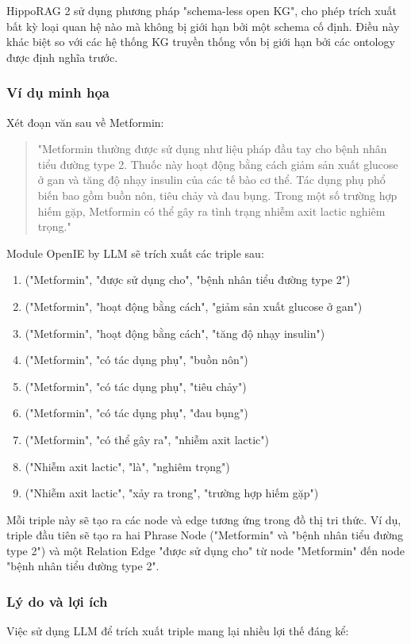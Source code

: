 HippoRAG 2 sử dụng phương pháp "schema-less open KG", cho phép trích xuất bất kỳ loại quan hệ nào mà không bị giới hạn bởi một schema cố định. Điều này khác biệt so với các hệ thống KG truyền thống vốn bị giới hạn bởi các ontology được định nghĩa trước.

\subsubsection{Ví dụ minh họa}
Xét đoạn văn sau về Metformin:

\begin{quote}
"Metformin thường được sử dụng như liệu pháp đầu tay cho bệnh nhân tiểu đường type 2. Thuốc này hoạt động bằng cách giảm sản xuất glucose ở gan và tăng độ nhạy insulin của các tế bào cơ thể. Tác dụng phụ phổ biến bao gồm buồn nôn, tiêu chảy và đau bụng. Trong một số trường hợp hiếm gặp, Metformin có thể gây ra tình trạng nhiễm axit lactic nghiêm trọng."
\end{quote}

Module OpenIE by LLM sẽ trích xuất các triple sau:

\begin{enumerate}
    \item ("Metformin", "được sử dụng cho", "bệnh nhân tiểu đường type 2")
    \item ("Metformin", "hoạt động bằng cách", "giảm sản xuất glucose ở gan")
    \item ("Metformin", "hoạt động bằng cách", "tăng độ nhạy insulin")
    \item ("Metformin", "có tác dụng phụ", "buồn nôn")
    \item ("Metformin", "có tác dụng phụ", "tiêu chảy")
    \item ("Metformin", "có tác dụng phụ", "đau bụng")
    \item ("Metformin", "có thể gây ra", "nhiễm axit lactic")
    \item ("Nhiễm axit lactic", "là", "nghiêm trọng")
    \item ("Nhiễm axit lactic", "xảy ra trong", "trường hợp hiếm gặp")
\end{enumerate}

Mỗi triple này sẽ tạo ra các node và edge tương ứng trong đồ thị tri thức. Ví dụ, triple đầu tiên sẽ tạo ra hai Phrase Node ("Metformin" và "bệnh nhân tiểu đường type 2") và một Relation Edge "được sử dụng cho" từ node "Metformin" đến node "bệnh nhân tiểu đường type 2".

\subsubsection{Lý do và lợi ích}
Việc sử dụng LLM để trích xuất triple mang lại nhiều lợi thế đáng kể:

